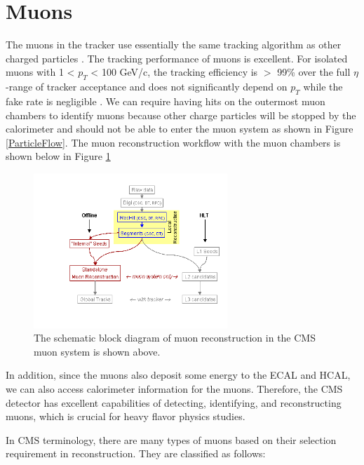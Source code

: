 \section{Muons}

The muons in the tracker use essentially the same tracking algorithm as other charged particles \cite{CMSTrackComp}. The tracking performance of muons is excellent. For isolated muons with 1 < $p_T$ < 100 GeV/c, the tracking efficiency is $>$ 99\% over the full $\eta$-range of tracker acceptance and does not significantly depend on $p_T$ while the fake rate is negligible \cite{CMSTrackComp}. We can require having hits on the outermost muon chambers to identify muons because other charge particles will be stopped by the calorimeter and should not be able to enter the muon system as shown in Figure \ref{ParticleFlow}. The muon reconstruction workflow with the muon chambers is shown below in Figure \ref{MuonReco}


\begin{figure}[hbtp]
\begin{center}
\includegraphics[width=0.65\textwidth]{Figures/Chapter4/MuonReco.png}
\caption{The schematic block diagram of muon reconstruction in the CMS muon system is shown above.}
\label{MuonReco}
\end{center}
\end{figure} 

In addition, since the muons also deposit some energy to the ECAL and HCAL, we can also access calorimeter information for the muons. Therefore, the CMS detector has excellent capabilities of detecting, identifying, and reconstructing muons, which is crucial for heavy flavor physics studies. 

In CMS terminology, there are many types of muons based on their selection requirement in reconstruction. They are classified as follows:



